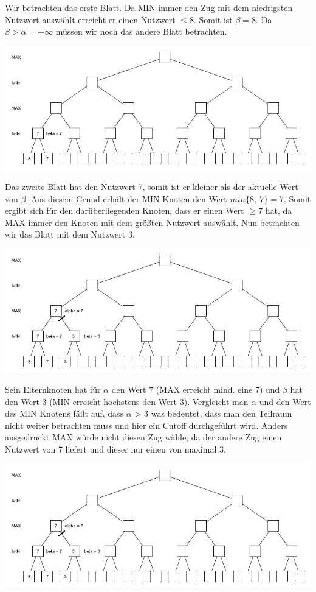 Wir betrachten das erste Blatt. Da MIN immer den Zug mit dem niedrigsten Nutzwert auswählt erreicht er einen Nutzwert $\le8$. Somit ist $\beta = 8$. Da $\beta > \alpha = -\infty$ müssen wir noch das andere Blatt betrachten.

\begin{center}
	\includegraphics[width = 12 cm]{chapters/minimax/jpg/Alpha-beta2.jpg}
\end{center}

Das zweite Blatt hat den Nutzwert 7, somit ist er kleiner als der aktuelle Wert von $\beta$. Aus diesem Grund erhält der MIN-Knoten den Wert $min\{8,~7\} =7$. Somit ergibt sich für den darüberliegenden Knoten, dass er einen Wert $\ge7$ hat, da MAX immer den Knoten mit dem größten Nutzwert auswählt. Nun betrachten wir das Blatt mit dem Nutzwert 3.

\begin{center}
	\includegraphics[width = 12 cm]{chapters/minimax/jpg/Alpha-beta3.jpg}
\end{center}

Sein Elternknoten hat für $\alpha$ den Wert 7 (MAX erreicht mind. eine 7) und $\beta$ hat den Wert 3 (MIN erreicht höchstens den Wert 3). Vergleicht man $\alpha$ und den Wert des MIN Knotens fällt auf, dass $\alpha$ > 3 was bedeutet, dass man den Teilraum nicht weiter betrachten muss und hier ein Cutoff durchgeführt wird. Anders ausgedrückt MAX würde nicht diesen Zug wähle, da der andere Zug einen Nutzwert von 7 liefert und dieser nur einen von maximal 3.

\begin{center}
	\includegraphics[width = 12 cm]{chapters/minimax/jpg/Alpha-beta3-1.jpg}
\end{center}


